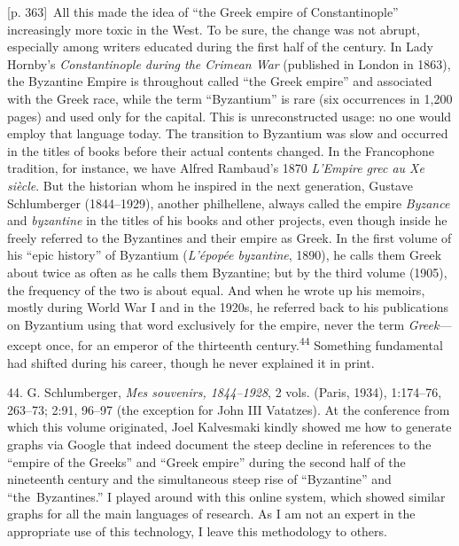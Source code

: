 \documentclass[10pt,a4paper]{article}
\begin{document}
{\scriptsize\color{gray}[p. 363]}\ All this made the idea of “the Greek empire of Constantinople” increasingly more toxic in the West. To be sure, the change was not abrupt, especially among writers educated during the first half of the century. In Lady Hornby’s \textit{Constantinople during the Crimean War} (published in London in 1863), the Byzantine Empire is throughout called “the Greek empire” and associated with the Greek race, while the term “Byzantium” is rare (six occurrences in 1,200 pages) and used only for the capital. This is unreconstructed usage: no one would employ that language today. The transition to Byzantium was slow and occurred in the titles of books before their actual contents changed. In the Francophone tradition, for instance, we have Alfred Rambaud’s 1870 \textit{L’Empire grec au Xe siècle}. But the historian whom he inspired in the next generation, Gustave Schlumberger (1844–1929), another philhellene, always called the empire \textit{Byzance} and \textit{byzantine} in the titles of his books and other projects, even though inside he freely referred to the Byzantines and their empire as Greek. In the first volume of his “epic history” of Byzantium (\textit{L’épopée byzantine}, 1890), he calls them Greek about twice as often as he calls them Byzantine; but by the third volume (1905), the frequency of the two is about equal. And when he wrote up his memoirs, mostly during World War I and in the 1920s, he referred back to his publications on Byzantium using that word exclusively for the empire, never the term \textit{Greek}—except once, for an emperor of the thirteenth century.\nobreak\textsuperscript{44} Something fundamental had shifted during his career, though he never explained it in print.\par{\small 44. G. Schlumberger, \textit{Mes souvenirs, 1844–1928}, 2 vols. (Paris, 1934), 1:174–76, 263–73; 2:91, 96–97 (the exception for John III Vatatzes). At the conference from which this volume originated, Joel Kalvesmaki kindly showed me how to generate graphs via Google that indeed document the steep decline in references to the “empire of the Greeks” and “Greek empire” during the second half of the nineteenth century and the simultaneous steep rise of “Byzantine” and “the Byzantines.” I played around with this online system, which showed similar graphs for all the main languages of research. As I am not an expert in the appropriate use of this technology, I leave this methodology to others.\par}
\end{document}
